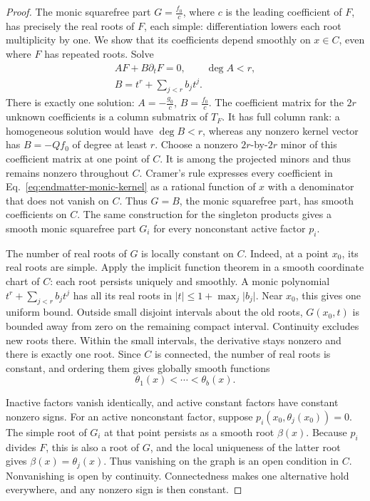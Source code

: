 \documentclass[aps,prl,reprint,notitlepage,nofootinbib,nobibnotes]{revtex4-2}
\begin{document}
\begin{proof}
The monic squarefree part \(G=\frac{f_0}{c}\), where \(c\) is the leading
coefficient of \(F\), has precisely the real roots of \(F\), each
simple: differentiation lowers each root multiplicity by one.
We show that its coefficients depend smoothly on \(x\in C\), even
where \(F\) has repeated roots. Solve
\begin{equation}\label{eq:endmatter-monic-kernel}
 \begin{gathered}
 AF+B\partial_tF=0,\qquad\deg A<r,\\
 B=t^r+\sum_{j<r}b_jt^j.
 \end{gathered}
\end{equation}
There is exactly one solution: \(A=-\frac{g_0}{c}\), \(B=\frac{f_0}{c}\). The coefficient
matrix for the \(2r\) unknown coefficients is a column submatrix of
\(T_F\). It has full column rank: a homogeneous
solution would have \(\deg B<r\), whereas any nonzero kernel vector
has \(B=-Qf_0\) of degree at least \(r\).
Choose a nonzero \(2r\)-by-\(2r\) minor of this coefficient matrix
at one point of \(C\). It is among
the projected minors and thus remains nonzero throughout \(C\).
Cramer's rule expresses every coefficient in Eq.~\eqref{eq:endmatter-monic-kernel}
as a rational function of \(x\) with a denominator that does not vanish
on \(C\). Thus \(G=B\), the monic squarefree part, has smooth
coefficients on \(C\). The same construction for the singleton
products gives a smooth monic squarefree part \(G_i\) for every
nonconstant active factor \(p_i\).

The number of real roots of \(G\) is locally constant on \(C\).
Indeed, at a point \(x_0\), its real roots are simple. Apply the
implicit function theorem in a smooth coordinate chart of \(C\):
each root persists uniquely and smoothly. A monic
polynomial \(t^r+\sum_{j<r}b_jt^j\) has all its real roots in
\(\lvert t\rvert\le1+\max_j\lvert b_j\rvert\). Near \(x_0\), this
gives one uniform bound. Outside small disjoint intervals about the old
roots, \(G(x_0,t)\) is bounded away from zero on the remaining compact
interval. Continuity excludes new roots there. Within the small
intervals, the derivative stays nonzero and there is exactly one root.
Since \(C\) is connected, the number of real roots is constant, and
ordering them gives globally smooth functions
\[
 \theta_1(x)<\cdots<\theta_b(x).
\]

Inactive factors vanish identically, and active constant factors have
constant nonzero signs. For an active nonconstant factor, suppose
\(p_i(x_0,\theta_j(x_0))=0\).
The simple root of \(G_i\) at that point persists as a smooth root
\(\beta(x)\). Because \(p_i\) divides \(F\), this is also a root of
\(G\), and the local uniqueness of the latter root gives
\(\beta(x)=\theta_j(x)\). Thus vanishing on the graph is an open
condition in \(C\). Nonvanishing is open by continuity. Connectedness
makes one alternative hold everywhere, and any nonzero sign is then
constant.


\end{proof}
\end{document}
